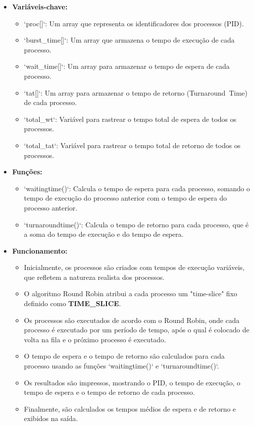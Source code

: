 \documentclass[
	12pt,				%
	openright,			%
	oneside,			%
	a4paper,			%
	chapter=TITLE,		%
	english,			%
	french,				%
	spanish,			%
	brazil				%
	]{abntex2}
\theoremstyle{definition}
\begin{document}
\begin{itemize}
    \item \textbf{Variáveis-chave:}
      \begin{itemize}
        \item `proc[]`: Um array que representa os identificadores dos processos (PID).
        \item `burst\_time[]`: Um array que armazena o tempo de execução de cada processo.
        \item `wait\_time[]`: Um array para armazenar o tempo de espera de cada processo.
        \item `tat[]`: Um array para armazenar o tempo de retorno (Turnaround\ Time) de cada processo.
        \item `total\_wt`: Variável para rastrear o tempo total de espera de todos os processos.
        \item `total\_tat`: Variável para rastrear o tempo total de retorno de todos os processos.
      \end{itemize}
  
    \item \textbf{Funções:}
      \begin{itemize}
        \item `waitingtime()`: Calcula o tempo de espera para cada processo, somando o tempo de execução do processo anterior com o tempo de espera do processo anterior.
        \item `turnaroundtime()`: Calcula o tempo de retorno para cada processo, que é a soma do tempo de execução e do tempo de espera.
      \end{itemize}
  
    \item \textbf{Funcionamento:}
      \begin{itemize}
        \item Inicialmente, os processos são criados com tempos de execução variáveis, que refletem a natureza realista dos processos.
        \item O algoritmo Round Robin atribui a cada processo um "time-slice" fixo definido como \textbf{TIME\_SLICE}.
        \item Os processos são executados de acordo com o Round Robin, onde cada processo é executado por um período de tempo, após o qual é colocado de volta na fila e o próximo processo é executado.
        \item O tempo de espera e o tempo de retorno são calculados para cada processo usando as funções `waitingtime()` e `turnaroundtime()`.
        \item Os resultados são impressos, mostrando o PID, o tempo de execução, o tempo de espera e o tempo de retorno de cada processo.
        \item Finalmente, são calculados os tempos médios de espera e de retorno e exibidos na saída.
      \end{itemize}
  \end{itemize}
\end{document}
